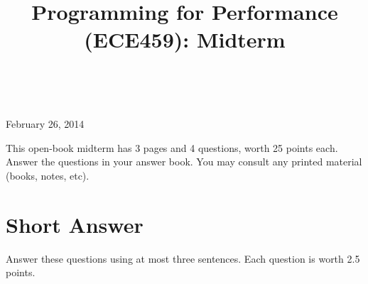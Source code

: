 \documentclass[12pt]{article}
\begin{document}
\title{Programming for Performance (ECE459): Midterm}
\author{}
\renewcommand{\today}{}
\maketitle

 ~\\[-8em]

\begin{center}
{\Large February 26, 2014}
\end{center}

This open-book midterm has 3 pages and 4 questions, worth 25 points each. Answer
the questions in your answer book. You may consult any printed
material (books, notes, etc).

\section{Short Answer}

Answer these questions using at most three sentences. Each question is worth
2.5 points.
\end{document}

